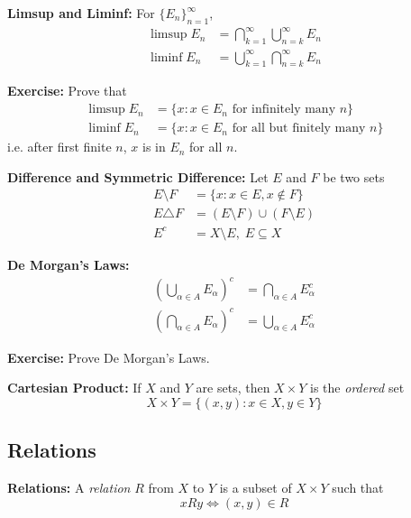 \documentclass[12pt]{article}
\newcommand{\sub}{\subseteq}
\newenvironment*{exercise}[1][red]{
    \begin{tcolorbox}[
        parbox=false,
        colback=#1!5!white,
        colframe=#1!75!black,
        breakable
    ]}
    {\end{tcolorbox}}
\begin{document}
    \textbf{Limsup and Liminf:} For $\{E_n\}_{n=1}^{\infty}$,
    \begin{align*}
        \limsup E_n &= \bigcap_{k=1}^{\infty} \bigcup_{n=k}^{\infty} E_n\\ 
        \liminf E_n &= \bigcup_{k=1}^{\infty} \bigcap_{n=k}^{\infty} E_n
    \end{align*}

    \begin{exercise}
        \textbf{Exercise:} Prove that 
        \begin{align*}
            \limsup E_n &= \{x : x\in E_n \text{ for infinitely many } n\}\\
            \liminf E_n &= \{x : x\in E_n \text{ for all but finitely many } n\}
        \end{align*}
        i.e. after first finite $n$, $x$ is in $E_n$ for all $n$.
    \end{exercise}

    \textbf{Difference and Symmetric Difference:} Let $E$ and $F$ be two sets
    \begin{align*}
        E \setminus F &= \{x : x\in E, x\not\in F\}\\
        E \triangle F &= (E \setminus F) \cup (F \setminus E)\\ 
        E^c &= X \setminus E, \; E \sub X
    \end{align*}

    \textbf{De Morgan's Laws:}
    \begin{align*}
        \left(\bigcup_{\alpha \in A} E_{\alpha}\right)^c &= \bigcap_{\alpha \in A} E_{\alpha}^c\\
        \left(\bigcap_{\alpha \in A} E_{\alpha}\right)^c &= \bigcup_{\alpha \in A} E_{\alpha}^c
    \end{align*}

    \begin{exercise}
        \textbf{Exercise:} Prove De Morgan's Laws.
    \end{exercise}

    \textbf{Cartesian Product:} If $X$ and $Y$ are sets, then $X \times Y$ is the \emph{ordered} set 
    \[X \times Y = \{(x, y): x \in X, y \in Y\}\]

    \subsection*{Relations}
    \textbf{Relations:} A \emph{relation} $R$ from $X$ to $Y$ is a subset of $X \times Y$ such that 
    \[xRy \iff (x, y) \in R\]
\end{document}
